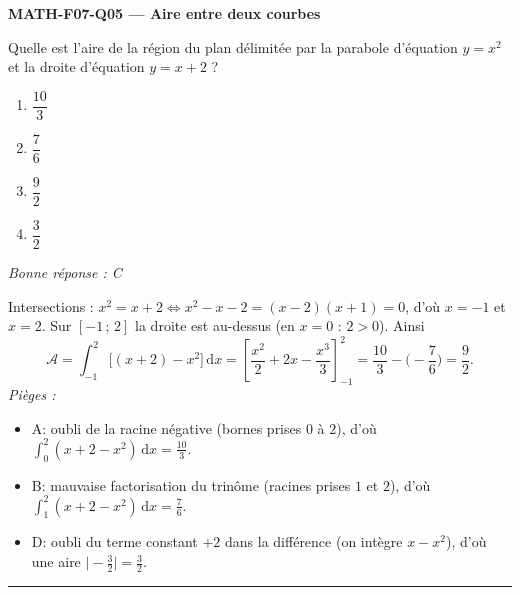 \documentclass[11pt,a4paper]{article}
\begin{document}
\noindent\textbf{MATH-F07-Q05 --- Aire entre deux courbes}\par
Quelle est l'aire de la région du plan délimitée par la parabole d'équation $y=x^{2}$ et la droite d'équation $y=x+2$ ?
\begin{enumerate}[label=\Alph*)]
\item $\dfrac{10}{3}$
\item $\dfrac{7}{6}$
\item $\dfrac{9}{2}$
\item $\dfrac{3}{2}$
\end{enumerate}
\textit{Bonne réponse : C}\par
Intersections : $x^{2}=x+2\Leftrightarrow x^{2}-x-2=(x-2)(x+1)=0$, d'où $x=-1$ et $x=2$. Sur $[-1\,;\,2]$ la droite est au-dessus (en $x=0$ : $2>0$). Ainsi
\[
\mathcal{A}=\int_{-1}^{2}\big[(x+2)-x^{2}\big]\,\mathrm{d}x
=\left[\dfrac{x^{2}}{2}+2x-\dfrac{x^{3}}{3}\right]_{-1}^{2}
=\dfrac{10}{3}-\Big(-\dfrac{7}{6}\Big)=\dfrac{9}{2}.
\]
\textit{Pièges :}
\begin{itemize}
\item A: oubli de la racine négative (bornes prises $0$ à $2$), d'où $\int_{0}^{2}(x+2-x^{2})\,\mathrm{d}x=\tfrac{10}{3}$.
\item B: mauvaise factorisation du trinôme (racines prises $1$ et $2$), d'où $\int_{1}^{2}(x+2-x^{2})\,\mathrm{d}x=\tfrac{7}{6}$.
\item D: oubli du terme constant $+2$ dans la différence (on intègre $x-x^{2}$), d'où une aire $\big|{-}\tfrac32\big|=\tfrac32$.
\end{itemize}
\vspace{8pt}\hrule\vspace{8pt}
\end{document}
